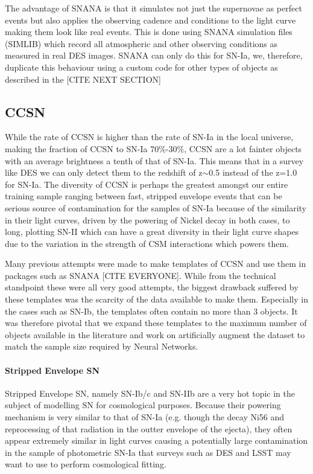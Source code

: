The advantage of SNANA is that it simulates not just the supernovae as perfect events but also applies the observing cadence and conditions to the light curve making them look like real events. This is done using SNANA simulation files (SIMLIB) which record all atmospheric and other observing conditions as measured in real DES images. SNANA can only do this for SN-Ia, we, therefore, duplicate this behaviour using a custom code for other types of objects as described in the [CITE NEXT SECTION]

\subsection{CCSN}
While the rate of CCSN is higher than the rate of SN-Ia in the local universe, making the fraction of CCSN to SN-Ia 70\%-30\%, CCSN are a lot fainter objects with an average brightness a tenth of that of SN-Ia. This means that in a survey like DES we can only detect them to the redshift of z$\sim$0.5 instead of the z=1.0 for SN-Ia. The diversity of CCSN is perhaps the greatest amongst our entire training sample ranging between fast, stripped envelope events that can be serious source of contamination for the samples of SN-Ia because of the similarity in their light curves, driven by the powering of Nickel decay in both cases, to long, plotting SN-II which can have a great diversity in their light curve shapes due to the variation in the strength of CSM interactions which powers them.

Many previous attempts were made to make templates of CCSN and use them in packages such as SNANA [CITE EVERYONE]. While from the technical standpoint these were all very good attempts, the biggest drawback suffered by these templates was the scarcity of the data available to make them. Especially in the cases such as SN-Ib, the templates often contain no more than 3 objects. It was therefore pivotal that we expand these templates to the maximum number of objects available in the literature and work on artificially augment the dataset to match the sample size required by Neural Networks.

\paragraph{Stripped Envelope SN}
Stripped Envelope SN, namely SN-Ib/c and SN-IIb are a very hot topic in the subject of modelling SN for cosmological purposes. Because their powering mechanism is very similar to that of SN-Ia (e.g. though the decay Ni56 and reprocessing of that radiation in the outter envelope of the ejecta), they often appear extremely similar in light curves causing a potentially large contamination in the sample of photometric SN-Ia that surveys such as DES and LSST may want to use to perform cosmological fitting.

